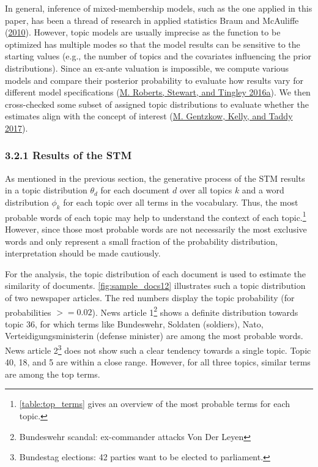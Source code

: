 \documentclass[
  12pt,
]{article}
\begin{document}
In general, inference of mixed-membership models, such as the one
applied in this paper, has been a thread of research in applied
statistics Braun and McAuliffe
(\protect\hyperlink{ref-braun_variational_2010}{2010}). However, topic
models are usually imprecise as the function to be optimized has
multiple modes so that the model results can be sensitive to the
starting values (e.g., the number of topics and the covariates
influencing the prior distributions). Since an ex-ante valuation is
impossible, we compute various models and compare their posterior
probability to evaluate how results vary for different model
specifications (\protect\hyperlink{ref-roberts_navigating_2016}{M.
Roberts, Stewart, and Tingley 2016a}). We then cross-checked some subset
of assigned topic distributions to evaluate whether the estimates align
with the concept of interest
(\protect\hyperlink{ref-gentzkow_text_2017}{M. Gentzkow, Kelly, and
Taddy 2017}).

\hypertarget{results-of-the-stm}{%
\subsubsection{3.2.1 Results of the STM}\label{results-of-the-stm}}

As mentioned in the previous section, the generative process of the STM
results in a topic distribution \(\theta_d\) for each document \(d\)
over all topics \(k\) and a word distribution \(\phi_k\) for each topic
over all terms in the vocabulary. Thus, the most probable words of each
topic may help to understand the context of each topic.\footnote{\autoref{table:top_terms}
  gives an overview of the most probable terms for each topic.} However,
since those most probable words are not necessarily the most exclusive
words and only represent a small fraction of the probability
distribution, interpretation should be made cautiously.

For the analysis, the topic distribution of each document is used to
estimate the similarity of documents. \autoref{fig:sample_docs12}
illustrates such a topic distribution of two newspaper articles. The red
numbers display the topic probability (for probabilities \(>= 0.02\)).
News article 1\footnote{Bundeswehr scandal: ex-commander attacks Von Der
  Leyen} shows a definite distribution towards topic 36, for which terms
like Bundeswehr, Soldaten (soldiers), Nato, Verteidigungsministerin
(defense minister) are among the most probable words. News article
2\footnote{Bundestag elections: 42 parties want to be elected to
  parliament.} does not show such a clear tendency towards a single
topic. Topic 40, 18, and 5 are within a close range. However, for all
three topics, similar terms are among the top terms.
\end{document}
